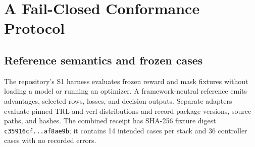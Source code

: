 \documentclass{article}
\begin{document}
\section{A Fail-Closed Conformance Protocol}
\label{sec:method}

\subsection{Reference semantics and frozen cases}

The repository's S1 harness evaluates frozen reward and mask fixtures without
loading a model or running an optimizer.  A framework-neutral reference emits
advantages, selected rows, losses, and decision outputs.  Separate adapters
evaluate pinned TRL \citep{vonwerra2020trl} and verl
\citep{sheng2024hybridflow} distributions and record package versions, source
paths, and hashes.  The combined receipt has SHA-256 fixture digest
\texttt{c35916cf...af8ae9b}; it contains 14 intended cases per stack and 36
controller cases with no recorded errors.
\end{document}
